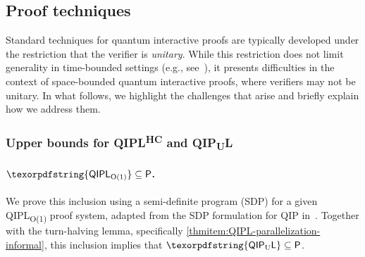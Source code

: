 \documentclass[10pt,a4paper]{article}
\numberwithin{equation}{section}
\numberwithin{figure}{section}
\newcommand{\Ptime}{\textnormal{\textsf{P}}\xspace}
\newcommand{\QIP}{\textnormal{\textsf{QIP}}\xspace}
\newcommand{\QIPLconst}{\texorpdfstring{\textnormal{\textsf{QIPL}\textsubscript{O(1)}}}\xspace}
\newcommand{\QIPUL}{\texorpdfstring{\textnormal{\textsf{QIP}\textsubscript{\textnormal{U}}\textsf{L}}}\xspace}
\newcommand{\QIPLHC}{\texorpdfstring{\textnormal{\textsf{QIPL}\textsuperscript{\textnormal{HC}}}}\xspace}
\begin{document}
\subsection{Proof techniques}

Standard techniques for quantum interactive proofs are typically developed under the restriction that the verifier is \textit{unitary}. While this restriction does not limit generality in time-bounded settings (e.g., see~\cite[Section 4.1.4]{VW16}), it presents difficulties in the context of space-bounded quantum interactive proofs, where verifiers may not be unitary. In what follows, we highlight the challenges that arise and briefly explain how we address them.  

\subsubsection{Upper bounds for \QIPLHC{} and \QIPUL{}}

\paragraph{$\QIPLconst \subseteq \Ptime$.} We prove this inclusion using a semi-definite program (SDP) for a given \QIPLconst{} proof system, adapted from the SDP formulation for \QIP{} in~\cite{VW16,Watrous16tutorial}. Together with the turn-halving lemma, specifically \ref{thmitem:QIPL-parallelization-informal}, this inclusion implies that $\QIPUL \subseteq \Ptime$. 
\end{document}
